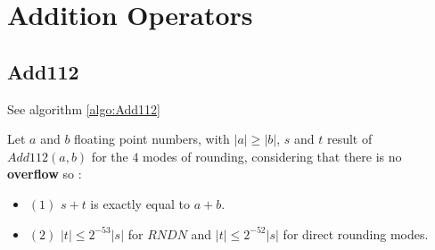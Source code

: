 \section{Addition Operators}

\subsection{Add112}

See algorithm \ref{algo:Add112}
\begin{lem}[Add112]\label{lem:add112}
Let $a$ and $b$  floating point numbers, with $\lvert a \rvert \ge \lvert b \rvert $, $s$ and $t$ result of $Add112(a,b)$ for the $4$ modes of rounding, considering that there is no \textbf{overflow} so :
\begin{itemize}
 \item  $(1)$ $s+t$ is exactly equal to $a+b$.              
\item  $(2)$ $ \lvert t \rvert \le 2^{-53}\lvert s \rvert $ for $RNDN$ and $ \lvert t \rvert \le 2^{-52}\lvert s \rvert $ for direct rounding modes.
\end{itemize} 
\end{lem}

